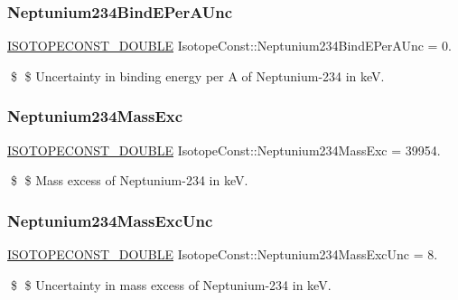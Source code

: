 \subsubsection{\texorpdfstring{Neptunium234\+Bind\+E\+Per\+A\+Unc}{Neptunium234BindEPerAUnc}}
{\footnotesize\ttfamily \mbox{\hyperlink{group___isotope_const-_macros_ga8f45a7272ce02c0b4c65c44636ed719a}{I\+S\+O\+T\+O\+P\+E\+C\+O\+N\+S\+T\+\_\+\+D\+O\+U\+B\+LE}} Isotope\+Const\+::\+Neptunium234\+Bind\+E\+Per\+A\+Unc = 0.}

\$ \$ Uncertainty in binding energy per A of Neptunium-\/234 in keV. \mbox{\label{group___isotope_const-_neptunium-_np234_gac90df5f2b034014780d1a1ad67b83bce}} 
\subsubsection{\texorpdfstring{Neptunium234\+Mass\+Exc}{Neptunium234MassExc}}
{\footnotesize\ttfamily \mbox{\hyperlink{group___isotope_const-_macros_ga8f45a7272ce02c0b4c65c44636ed719a}{I\+S\+O\+T\+O\+P\+E\+C\+O\+N\+S\+T\+\_\+\+D\+O\+U\+B\+LE}} Isotope\+Const\+::\+Neptunium234\+Mass\+Exc = 39954.}

\$ \$ Mass excess of Neptunium-\/234 in keV. \mbox{\label{group___isotope_const-_neptunium-_np234_gaedb3eb001cc2d2cc3f96ca83cd5780f2}} 
\subsubsection{\texorpdfstring{Neptunium234\+Mass\+Exc\+Unc}{Neptunium234MassExcUnc}}
{\footnotesize\ttfamily \mbox{\hyperlink{group___isotope_const-_macros_ga8f45a7272ce02c0b4c65c44636ed719a}{I\+S\+O\+T\+O\+P\+E\+C\+O\+N\+S\+T\+\_\+\+D\+O\+U\+B\+LE}} Isotope\+Const\+::\+Neptunium234\+Mass\+Exc\+Unc = 8.}

\$ \$ Uncertainty in mass excess of Neptunium-\/234 in keV. \mbox{\label{group___isotope_const-_neptunium-_np234_ga57f48e640408545e7b0655ba7926b969}} 
